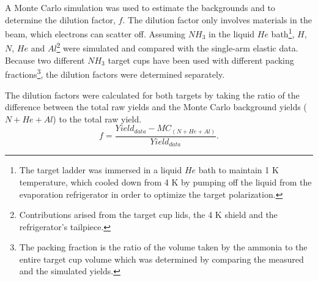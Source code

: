 \documentclass[12pt]{article}
\begin{document}
A Monte Carlo simulation was used to estimate the backgrounds and to determine the dilution factor, $f$. The dilution factor only involves materials in the beam, which electrons can scatter off. Assuming $NH_3$ in the liquid $He$ bath\footnote{The target ladder was immersed in a liquid $He$ bath to maintain 1 K temperature, which cooled down from 4 K by pumping off the liquid from the evaporation refrigerator in order to optimize the target polarization.}, $H$, $N$, $He$ and $Al$\footnote{Contributions arised from the target cup lids, the 4 K shield and the refrigerator's tailpiece.} were simulated and compared with the single-arm elastic data. Because two different $NH_3$ target cups have been used with different packing fractions\footnote{The packing fraction is the ratio of the volume taken by the ammonia to the entire target cup volume which was determined by comparing the measured and the simulated yields.}, the dilution factors were determined separately. 

The dilution factors were calculated for both targets by taking the ratio of the difference between the total raw yields and the Monte Carlo background yields ($N+He+Al$) to the total raw yield.  
\begin{equation}
\label{dfsin}
f=\frac{Yield_{data}-MC_{(N+He+Al)}}{Yield_{data}}.
\end{equation}
\end{document}
